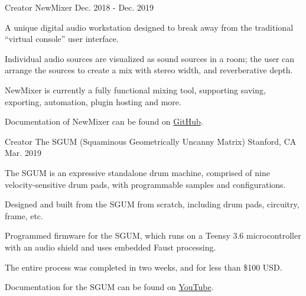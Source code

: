 \begin{cventries}
  \cventry
    {Creator} %
    {NewMixer} %
    {} %
    {Dec. 2018 - Dec. 2019} %
    {
      \begin{cvitems} %
        \item {A unique digital audio workstation designed to break away from the traditional ``virtual console'' user interface.}
        \item {Individual audio sources are visualized as sound sources in a room; the user can arrange the sources to create a mix with stereo width, and reverberative depth.}
        \item {NewMixer is currently a fully functional mixing tool, supporting saving, exporting, automation, plugin hosting and more.}
        \item {Documentation of NewMixer can be found on \href{https://github.com/jatinchowdhury18/NewMixer}{GitHub}.}
      \end{cvitems}
    }


  \cventry
    {Creator} %
    {The SGUM (Squaminous Geometrically Uncanny Matrix)} %
    {Stanford, CA} %
    {Mar. 2019} %
    {
      \begin{cvitems} %
        \item {The SGUM is an expressive standalone drum machine, comprised of nine velocity-sensitive drum pads, with programmable samples and configurations.}
        \item {Designed and built from the SGUM from scratch, including drum pads, circuitry, frame, etc.}
        \item {Programmed firmware for the SGUM, which runs on a Teensy 3.6 microcontroller with an audio shield and uses embedded Faust processing.}
        \item {The entire process was completed in two weeks, and for less than \$100 USD.}
        \item {Documentation for the SGUM can be found on \href{https://www.youtube.com/watch?v=NOcPRS4LxpQ}{YouTube}.}
      \end{cvitems}
    }


\end{cventries}
